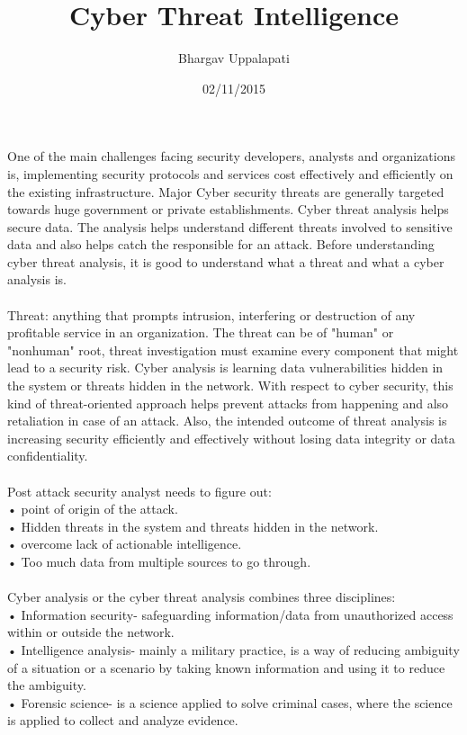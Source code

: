 \documentclass{article}
\title{Cyber Threat Intelligence}
\author{Bhargav Uppalapati}
\date{02/11/2015}
\begin{document}
\maketitle
One of the main challenges facing security developers, analysts and organizations is, implementing security protocols and services cost effectively and efficiently on the existing infrastructure. Major Cyber security threats are generally targeted towards huge government or private establishments. Cyber threat analysis helps secure data. The analysis helps understand different threats involved to sensitive data and also helps catch the responsible for an attack. Before understanding cyber threat analysis, it is good to understand what a threat and what a cyber analysis is. 
\\
\\
Threat: anything that prompts intrusion, interfering or destruction of any profitable service in an organization. The threat can be of "human" or "nonhuman" root, threat investigation must examine every component that might lead to a security risk.
Cyber analysis is learning data vulnerabilities hidden in the system or threats hidden in the network. With respect to cyber security, this kind of threat-oriented approach helps prevent attacks from happening and also retaliation in case of an attack. Also, the intended outcome of threat analysis is increasing security efficiently and effectively without losing data integrity or data confidentiality.
\\
\\
Post attack security analyst needs to figure out: \\
•	point of origin of the attack.\\
•	Hidden threats in the system and threats hidden in the network.\\
•	overcome lack of actionable intelligence.\\
•	Too much data from multiple sources to go through.\\
\\
Cyber analysis or the cyber threat analysis combines three disciplines:\\
•	Information security- safeguarding information/data from unauthorized access within or outside the network.\\
•	Intelligence analysis- mainly a military practice, is a way of reducing ambiguity of a situation or a scenario by taking known			information and using it to reduce the ambiguity.\\
•	Forensic science- is a science applied to solve criminal cases, where the science is applied to collect and analyze evidence.\\
\end{document}
